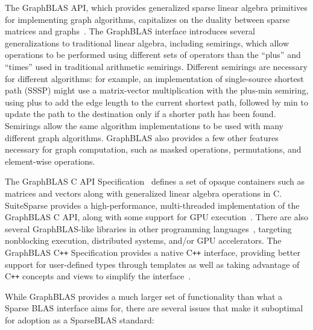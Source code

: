 \documentclass[manuscript,review]{acmart}
\newcommand{\cplusplus}{C\texttt{++}\xspace}
\begin{document}
The GraphBLAS API, which provides generalized sparse linear algebra primitives for implementing graph algorithms, capitalizes on the duality between sparse matrices and graphs~\cite{brock2021graphblas}. The GraphBLAS interface introduces several generalizations to traditional linear algebra, including semirings, which allow operations to be performed using different sets of operators than the ``plus'' and ``times'' used in traditional arithmetic semirings.  Different semirings are necessary for different algorithms: for example, an implementation of single-source shortest path (SSSP) might use a matrix-vector multiplication with the plus-min semiring, using plus to add the edge length to the current shortest path, followed by min to update the path to the destination only if a shorter path has been found.  Semirings allow the same algorithm implementations to be used with many different graph algorithms.  GraphBLAS also provides a few other features necessary for graph computation, such as masked operations, permutations, and element-wise operations.

The GraphBLAS C API Specification~\cite{brock2021graphblas} defines a
set of opaque containers such as matrices and vectors along with
generalized linear algebra operations in C.  SuiteSparse provides a
high-performance, multi-threaded implementation of the GraphBLAS C API,
along with some support for GPU
execution~\cite{davis2019algorithm,davis2023algorithm}. There are also
several GraphBLAS-like libraries in other programming
languages~\cite{erik_welch_2024_10631255, yzelman2020c++,
yang2022graphblast},
targeting nonblocking execution, distributed systems, and/or GPU accelerators.
The GraphBLAS \cplusplus Specification provides
a native \cplusplus interface, providing better support for
user-defined types through templates as well as taking advantage of
\cplusplus concepts and views to simplify the
interface~\cite{9150467,graphblascppspec}.

While GraphBLAS provides a much larger set of functionality than what a Sparse
BLAS interface aims for, there are several issues that make it suboptimal for adoption
as a SparseBLAS standard:
\end{document}
